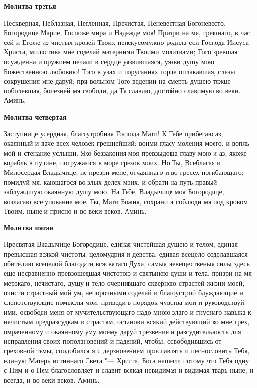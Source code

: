 \medskip


\bfseries Молитва третья\normalfont{}


Нескверная, Неблазная, Нетленная, Пречистая, Неневестная Богоневесто, Богородице Марие, Госпоже мира и Надежде моя! Призри на мя, грешнаго, в час сей и Егоже из чистых кровей Твоих неискусомужно родила еси Господа Иисуса Христа, милостива мне соделай матерними Твоими молитвами; Того зревшая осужденна и оружием печали в сердце уязвившаяся, уязви душу мою Божественною любовию! Того в узах и поруганиях горце оплакавшая, слезы сокрушения мне даруй; при вольном Того ведении на смерть душею тяжце поболевшая, болезней мя свободи, да Тя славлю, достойно славимую во веки. Аминь.


\medskip


\bfseries Молитва четвертая\normalfont{}


Заступнице усердная, благоутробная Господа Мати! К Тебе прибегаю аз, окаянный и паче всех человек грешнейший: вонми гласу моления моего, и вопль мой и стенание услыши. Яко беззакония моя превзыдоша главу мою и аз, якоже корабль в пучине, погружаюся в море грехов моих. Но Ты, Всеблагая и Милосердая Владычице, не презри мене, отчаяннаго и во гресех погибающаго; помилуй мя, кающагося во злых делех моих, и обрати на путь правый заблуждшую окаянную душу мою. На Тебе, Владычице моя Богородице, возлагаю все упование мое. Ты, Мати Божия, сохрани и соблюди мя под кровом Твоим, ныне и присно и во веки веков. Аминь.


\medskip


\bfseries Молитва пятая\normalfont{}


Пресвятая Владычице Богородице, единая чистейшая душею и телом, единая превысшая всякой чистоты, целомудрия и девства, единая всецело соделавшаяся обителию всецелой благодати всясвятаго Духа, самыя невещественыя силы здесь еще несравненно превзошедшая чистотою и святынею души и тела, призри на мя мерзкаго, нечистаго, душу и тело очернившаго скверною страстей жизни моей, очисти страстный мой ум, непорочными соделай и благоустрой блуждающие и слепотствующие помыслы мои, приведи в порядок чувства мои и руководствуй ими, освободи меня от мучительствующаго надо мною злаго и гнуснаго навыка к нечистым предразсудкам и страстям, останови всякий действующий во мне грех, омраченному и окаянному уму моему даруй трезвение и разсудительность для исправления своих поползновений и падений, чтобы, освободившись от греховной тьмы, сподобился я с дерзновением прославлять и песнословить Тебя, единую Матерь истиннаго Света "--- Христа, Бога нашего; потому что Тебя одну с Ним и о Нем благословляет и славит всякая невидимая и видимая тварь ныне, и всегда, и во веки веков. Аминь.


